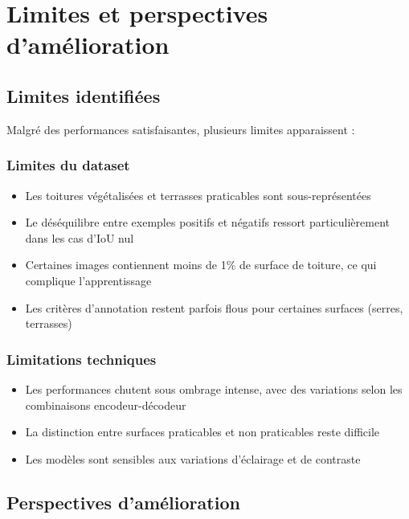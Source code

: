 \section{Limites et perspectives d'amélioration}

\subsection{Limites identifiées}

Malgré des performances satisfaisantes, plusieurs limites apparaissent :

\subsubsection{Limites du dataset}
\begin{itemize}
    \item Les toitures végétalisées et terrasses praticables sont sous-représentées
    \item Le déséquilibre entre exemples positifs et négatifs ressort particulièrement dans les cas d'IoU nul
    \item Certaines images contiennent moins de 1\% de surface de toiture, ce qui complique l'apprentissage
    \item Les critères d'annotation restent parfois flous pour certaines surfaces (serres, terrasses)
\end{itemize}

\subsubsection{Limitations techniques}
\begin{itemize}
    \item Les performances chutent sous ombrage intense, avec des variations selon les combinaisons encodeur-décodeur
    \item La distinction entre surfaces praticables et non praticables reste difficile
    \item Les modèles sont sensibles aux variations d'éclairage et de contraste
\end{itemize}

\subsection{Perspectives d'amélioration}

